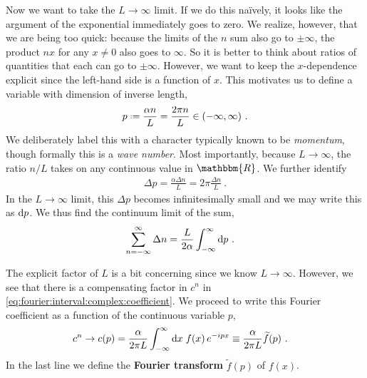 \documentclass[12pt, oneside]{report}    %
\begin{document}
Now we want to take the $L\to \infty$ limit. If we do this na\"ively, it looks like the argument of the exponential immediately goes to zero. We realize, however, that we are being too quick: because the limits of the $n$ sum also go to $\pm \infty$, the product $nx$ for any $x\neq 0$ also goes to $\infty$. So it is better to think about ratios of quantities that each can go to $\pm\infty$. However, we want to keep the $x$-dependence explicit since the left-hand side is a function of $x$. This motivates us to define a variable with dimension of inverse length,
\begin{align}
    p \defeq \frac{\alpha n}{L} = \frac{2\pi n}{L} \in (-\infty,\infty) \ .
\end{align}
We deliberately label this with a character typically known to be \emph{momentum}, though formally this is a \emph{wave number}. Most importantly, because $L\to\infty$, the ratio $n/L$ takes on any continuous value in $\mathbbm{R}$. We further identify 
\begin{align}
    \Delta p = \frac{\alpha \Delta n}{L} = 2\pi\frac{\Delta n}{L} \ .
\end{align}
In the $L\to\infty$ limit, this $\Delta p$ becomes infinitesimally small and we may write this as $\operatorname{d}\!{p}$. We thus find the continuum limit of the sum,
\begin{align}
    \sum_{n=-\infty}^\infty \Delta n &=
    \frac{L}{2\alpha} \int_{-\infty}^\infty \operatorname{d}\!{p} \ .
    \label{eq:toward:fourier:transform:sum:to:int}
\end{align}


The explicit factor of $L$ is a bit concerning since we know $L\to\infty$. However, we see that there is a compensating factor in $c^n$ in \eqref{eq:fourier:interval:complex:coefficient}. We proceed to write this Fourier coefficient as a function of the continuous variable $p$,
\begin{align}
    c^n \to c(p)
     &= \frac{\alpha}{2\pi L} \int_{-\infty}^{\infty} \operatorname{d}\!{x}\; f(x)\, e^{-ip x} 
     \equiv 
     \frac{\alpha}{2\pi L} \widetilde{f}(p)
     \ .
    \label{eq:toward:fourier:transform:cn:to:cp}
\end{align}
In the last line we define the \textbf{Fourier transform} $\tilde{f}(p)$ of $f(x)$. 
\end{document}
